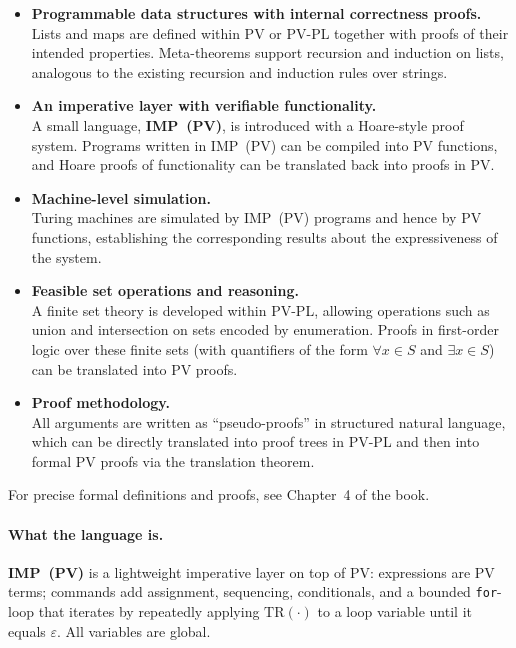 \begin{itemize}
  \item \textbf{Programmable data structures with internal correctness proofs.} \\
  Lists and maps are defined within PV or PV-PL together with proofs of their intended properties. Meta-theorems support recursion and induction on lists, analogous to the existing recursion and induction rules over strings.

  \item \textbf{An imperative layer with verifiable functionality.} \\
  A small language, \textbf{IMP~(PV)}, is introduced with a Hoare-style proof system. Programs written in IMP~(PV) can be compiled into PV functions, and Hoare proofs of functionality can be translated back into proofs in PV.\@

  \item \textbf{Machine-level simulation.} \\
  Turing machines are simulated by IMP~(PV) programs and hence by PV functions, establishing the corresponding results about the expressiveness of the system.

  \item \textbf{Feasible set operations and reasoning.} \\
  A finite set theory is developed within PV-PL, allowing operations such as union and intersection on sets encoded by enumeration. Proofs in first-order logic over these finite sets (with quantifiers of the form $\forall x \in S$ and $\exists x \in S$) can be translated into PV proofs.

  \item \textbf{Proof methodology.} \\
  All arguments are written as ``pseudo-proofs'' in structured natural language, which can be directly translated into proof trees in PV-PL and then into formal PV proofs via the translation theorem.
\end{itemize}

\noindent
For precise formal definitions and proofs, see Chapter~4 of the book.

\paragraph{What the language is.}
\textbf{IMP~(PV)} is a lightweight imperative layer on top of PV\@: expressions are PV terms; commands add assignment, sequencing, conditionals, and a bounded \texttt{for}-loop that iterates by repeatedly applying \(\mathrm{TR}(\cdot)\) to a loop variable until it equals \(\varepsilon\).\@
All variables are global.

